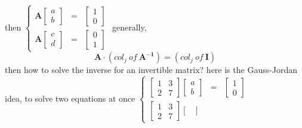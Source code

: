 \documentclass[12pt, a4paper]{article}
\begin{document}
{\begin{math}
{	}
\end{math}
\par then
\begin{math}
	\left\{  
	\begin{array}{rcl}
		{\mathbf{A}}
		\begin{bmatrix}
			a \\
			b 
		\end{bmatrix}
		& = & 
		\begin{bmatrix}
		 	1 \\
		 	0 
		\end{bmatrix} 
		\\
		{\mathbf{A}}
		\begin{bmatrix}
			c \\
			d 
		\end{bmatrix}
		& = & 
		\begin{bmatrix}
		 	0 \\
		 	1 
		\end{bmatrix}
	\end{array}  
	\right.
\end{math}
\newline
generally, 
\begin{displaymath}
	{\mathbf{A}} \cdot (col_j \ of \ {\mathbf{A^{-1}}}) = (col_j \ of \ {\mathbf{I}})
\end{displaymath}
\vspace{14pt}
\newline
then how to solve the inverse for an invertible matrix?
\newline
here is the Gauss-Jordan idea, to solve two equations at once
\newline
\begin{math}
	\left\{  
	\begin{array}{rcl}
		\begin{bmatrix}
			1 & 3 \\
			2 & 7 
		\end{bmatrix}
		\begin{bmatrix}
			a \\
			b 
		\end{bmatrix}
		& = & 
		\begin{bmatrix}
			1 \\
			0 
		\end{bmatrix} 
		\\
		\begin{bmatrix}
			1 & 3 \\
			2 & 7 
		\end{bmatrix}
		\begin{bmatrix}

\end{bmatrix}
\end{array}
\end{math}}
\end{document}
